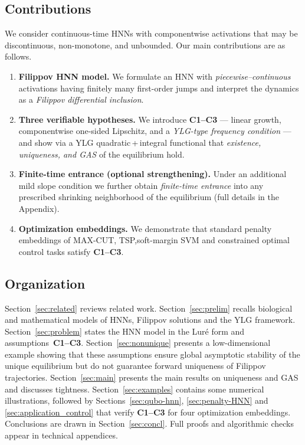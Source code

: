 \documentclass[journal]{IEEEtran}
\begin{document}
\subsection{Contributions}\label{sec:intro:contrib}
We consider continuous-time HNNs with componentwise activations that may be discontinuous, non-monotone, and unbounded.
Our main contributions are as follows.
\begin{enumerate}[label=\textbf{(\alph*)},leftmargin=*]
\item \textbf{Filippov HNN model.} We formulate an HNN with \emph{piecewise--continuous} activations
      having finitely many first-order jumps and interpret the dynamics as a \emph{Filippov differential inclusion}.
\item \textbf{Three verifiable hypotheses.} 
      We introduce \textbf{C1--C3} --- linear growth, componentwise one-sided
      Lipschitz, and a \emph{YLG-type frequency condition} --- and show via a YLG
      quadratic\,+\,integral functional that \emph{existence, uniqueness, and GAS} of the equilibrium hold.
\item \textbf{Finite-time entrance (optional strengthening).}
      Under an additional mild slope condition we further obtain \emph{finite-time entrance} into any prescribed
      shrinking neighborhood of the equilibrium (full details in the Appendix).
\item \textbf{Optimization embeddings.} We demonstrate that standard penalty embeddings of
      MAX-CUT, TSP,soft-margin SVM and constrained optimal control tasks satisfy \textbf{C1--C3}.
\end{enumerate}

\subsection{Organization}\label{sec:intro:org}
Section~\ref{sec:related} reviews related work.
Section~\ref{sec:prelim} recalls biological and mathematical models of HNNs,
Filippov solutions and the YLG framework.
Section~\ref{sec:problem} states the HNN model in the Lur\'{e} form and assumptions~\textbf{C1--C3}. Section~\ref{sec:nonunique} presents a low-dimensional example showing that 
these assumptions ensure global asymptotic stability of the unique equilibrium 
but do not guarantee forward uniqueness of Filippov trajectories. Section~\ref{sec:main} presents the main results on uniqueness and GAS and discusses tightness.
Section~\ref{sec:examples} contains some numerical illustrations, followed by Sections~\ref{sec:qubo-hnn}, \ref{sec:penalty-HNN} and \ref{sec:application_control} that verify \textbf{C1--C3} for four optimization embeddings.
Conclusions are drawn in Section~\ref{sec:concl}.
Full proofs and algorithmic checks appear in technical appendices.
\end{document}
